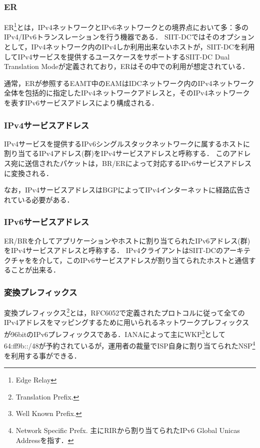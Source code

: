 \subsubsection{ER}
ER\footnote{Edge Relay}とは，IPv4ネットワークとIPv6ネットワークとの境界点において多：多のIPv4/IPv6トランスレーションを行う機器である．
SIIT-DCではそのオプションとして，IPv4ネットワーク内のIPv4しか利用出来ないホストが，SIIT-DCを利用してIPv4サービスを提供するユースケースをサポートするSIIT-DC Dual Translation Mode\cite{RFC7756}が定義されており，ERはその中での利用が想定されている．

通常，ERが参照するEAMT中のEAMはIDCネットワーク内のIPv4ネットワーク全体を包括的に指定したIPv4ネットワークアドレスと，そのIPv4ネットワークを表すIPv6サービスアドレスにより構成される．

\subsubsection{IPv4サービスアドレス}
IPv4サービスを提供するIPv6シングルスタックネットワークに属するホストに割り当てるIPv4アドレス(群)をIPv4サービスアドレスと呼称する．
このアドレス宛に送信されたパケットは，BR/ERによって対応するIPv6サービスアドレスに変換される．

なお，IPv4サービスアドレスはBGP\cite{RFC4271}によってIPv4インターネットに経路広告されている必要がある．

\subsubsection{IPv6サービスアドレス}
ER/BRを介してアプリケーションやホストに割り当てられたIPv6アドレス(群)をIPv4サービスアドレスと呼称する．
IPv4クライアントはSIIT-DCのアーキテクチャをを介して，このIPv6サービスアドレスが割り当てられたホストと通信することが出来る．

\subsubsection{変換プレフィックス}
\label{issue:siit-dc:translation-prefix}
 
変換プレフィックス\footnote{Translation Prefix.}とは，RFC6052\cite{RFC6052}で定義されたプロトコルに従って全てのIPv4アドレスをマッピングするために用いられるネットワークプレフィックスが96bitのIPv6プレフィックスである．IANAによって主にWKP\footnote{Well Known Prefix. }として64:ff9b::/48が予約\cite{RFC8215,IANA_allocation_v6}されているが，運用者の裁量でISP自身に割り当てられたNSP\footnote{Network Specific Prefx. 主にRIRから割り当てられたIPv6 Global Unicas Addressを指す．}を利用する事ができる．

